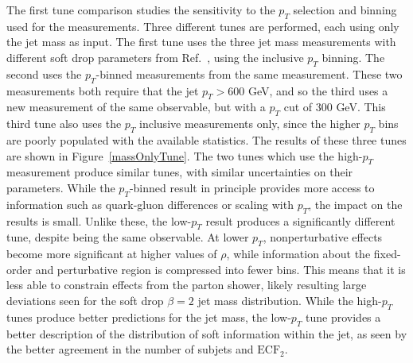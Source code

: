The first tune comparison studies the sensitivity to the $p_T$ selection and binning used for the measurements. Three different tunes are performed, each using only the jet mass as input.
The first tune uses the three jet mass measurements with different soft drop parameters from Ref.~\cite{softdropMass}, using the inclusive $p_T$ binning. 
The second uses the $p_T$-binned measurements from the same measurement. These two measurements both require that the jet $p_T > 600$ GeV, and so the third uses a new measurement of the
same observable, but with a $p_T$ cut of 300 GeV. This third tune also uses the $p_T$ inclusive measurements only, since the higher $p_T$ bins are poorly populated with the available statistics.
The results of these three tunes are shown in Figure~\ref{massOnlyTune}. 
The two tunes which use the high-$p_T$ measurement produce similar tunes, with similar uncertainties on their parameters. 
While the $p_T$-binned result in principle provides more access to information such as quark-gluon differences or scaling with $p_T$, the impact on the results is small. 
Unlike these, the low-$p_T$ result produces a significantly different tune, despite being the same observable. 
At lower $p_T$, nonperturbative effects become more significant at higher values of $\rho$, while information about the fixed-order and perturbative region is compressed into fewer bins.
This means that it is less able to constrain effects from the parton shower, likely resulting large deviations seen for the soft drop $\beta=2$ jet mass distribution.
While the high-$p_T$ tunes produce better predictions for the jet mass, the low-$p_T$ tune provides a better description of the distribution of soft information within the jet, 
as seen by the better agreement in the number of subjets and $\mathrm{ECF}_2$.


